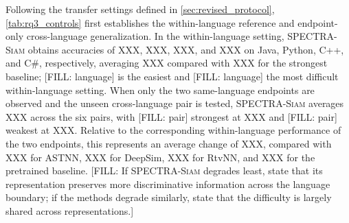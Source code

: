 \documentclass[final,5p,times,twocolumn]{elsarticle}
\newcommand{\method}{\textsc{SPECTRA-Siam}}
\theoremstyle{plain}
\begin{document}
Following the transfer settings defined in \autoref{sec:revised_protocol}, \autoref{tab:rq3_controls} first establishes the within-language reference and endpoint-only cross-language generalization. In the within-language setting, \method{} obtains accuracies of XXX, XXX, XXX, and XXX on Java, Python, C++, and C\#, respectively, averaging XXX compared with XXX for the strongest baseline; [FILL: language] is the easiest and [FILL: language] the most difficult within-language setting. When only the two same-language endpoints are observed and the unseen cross-language pair is tested, \method{} averages XXX across the six pairs, with [FILL: pair] strongest at XXX and [FILL: pair] weakest at XXX. Relative to the corresponding within-language performance of the two endpoints, this represents an average change of XXX, compared with XXX for ASTNN, XXX for DeepSim, XXX for RtvNN, and XXX for the pretrained baseline. [FILL: If \method{} degrades least, state that its representation preserves more discriminative information across the language boundary; if the methods degrade similarly, state that the difficulty is largely shared across representations.]
\end{document}

